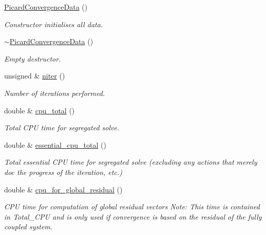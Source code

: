 \begin{DoxyCompactItemize}
\item 
\hyperlink{classoomph_1_1PicardConvergenceData_a48c244adc14b7d4d741f9083f277f779}{Picard\+Convergence\+Data} ()
\begin{DoxyCompactList}\small\item\em Constructor initialises all data. \end{DoxyCompactList}\item 
\hyperlink{classoomph_1_1PicardConvergenceData_a875840ce0db8db0409dd4356319f0c06}{$\sim$\+Picard\+Convergence\+Data} ()
\begin{DoxyCompactList}\small\item\em Empty destructor. \end{DoxyCompactList}\item 
unsigned \& \hyperlink{classoomph_1_1PicardConvergenceData_a24be0531f3c97ca7daf7d482ce1a99f9}{niter} ()
\begin{DoxyCompactList}\small\item\em Number of iterations performed. \end{DoxyCompactList}\item 
double \& \hyperlink{classoomph_1_1PicardConvergenceData_af1a46967e1e469e08b059a814dac9bf5}{cpu\+\_\+total} ()
\begin{DoxyCompactList}\small\item\em Total C\+PU time for segregated solve. \end{DoxyCompactList}\item 
double \& \hyperlink{classoomph_1_1PicardConvergenceData_abb555813a3773fe0afb86b5097428545}{essential\+\_\+cpu\+\_\+total} ()
\begin{DoxyCompactList}\small\item\em Total essential C\+PU time for segregated solve (excluding any actions that merely doc the progress of the iteration, etc.) \end{DoxyCompactList}\item 
double \& \hyperlink{classoomph_1_1PicardConvergenceData_a2e2266352cabc2b30682e0db8bf6aeb3}{cpu\+\_\+for\+\_\+global\+\_\+residual} ()
\begin{DoxyCompactList}\small\item\em C\+PU time for computation of global residual vectors Note\+: This time is contained in Total\+\_\+\+C\+PU and is only used if convergence is based on the residual of the fully coupled system. \end{DoxyCompactList}\item 

\end{DoxyCompactItemize}
